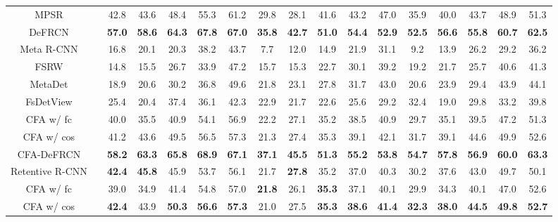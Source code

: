 \documentclass[10pt,twocolumn,letterpaper]{article}
\newcommand{\cmark}{\ding{51}}\newcommand{\xmark}{\ding{55}}\newcommand\minisection[1]{\vspace{1mm}\noindent \textbf{#1}}
\newcommand{\best}[1]{\color{red}\textbf{#1}}
\newcommand{\second}[1]{\color{blue}\textbf{#1}}
\begin{document}
\begin{table*}
\begin{tabular}{c| c | c c c c c | c c c c c | c c c c c}
      MPSR\cite{MPSR}& \xmark & 42.8 & 43.6 & 48.4 & 55.3 & 61.2 & 29.8 & 28.1 & 41.6 & 43.2 & 47.0 & 35.9 & 40.0 & 43.7 & 48.9 & 51.3 \\
      DeFRCN\cite{defrcn}& \xmark & \second{57.0} & \second{58.6} & \second{64.3} & \second{67.8} & \second{67.0} &
     \second{35.8} & \second{42.7} & \second{51.0} & \second{54.4} & \second{52.9} & \second{52.5} & \second{56.6} & \second{55.8} & \best{60.7} & \second{62.5} \\ \Xhline{1pt}
      Meta R-CNN\cite{MetaRCNN}& \xmark & 16.8 & 20.1 & 20.3 & 38.2 & 43.7 & 7.7 & 12.0 & 14.9 & 21.9 & 31.1 & 9.2 & 13.9 & 26.2 & 29.2 & 36.2 \\
      FSRW\cite{FSRW}& \xmark & 14.8 & 15.5 & 26.7 & 33.9 & 47.2 & 15.7 & 15.3 & 22.7 & 30.1 & 39.2 & 19.2 & 21.7 & 25.7 & 40.6 & 41.3 \\
      MetaDet\cite{MetaDet}& \xmark & 18.9 & 20.6 & 30.2 & 36.8 & 49.6 & 21.8 & 23.1 & 27.8 & 31.7 & 43.0 & 20.6 & 23.9 & 29.4 & 43.9 & 44.1\\
      FsDetView\cite{FsDetView}& \xmark & 25.4 & 20.4 & 37.4 & 36.1 & 42.3 & 22.9 & 21.7 & 22.6 & 25.6 & 29.2 & 32.4 & 19.0 & 29.8 & 33.2 & 39.8 \\ \Xhline{1pt}
      \rowcolor[HTML]{EFEFEF}
      CFA w/ fc& \xmark & 40.0 & 35.5 & 40.9 & 54.1 & 56.9 & 22.2 & 27.1 & 35.2 & 38.5 & 40.9 & 29.7 & 35.1 & 39.5 & 47.2 & 51.3 \\
      \rowcolor[HTML]{EFEFEF}
      CFA w/ cos& \xmark & 41.2 & 43.6 & 49.5 & 56.5 & 57.3 & 21.3 & 27.4 & 35.3 & 39.1 & 42.1 & 31.7 & 39.1 & 44.6 & 49.9 & 52.6 \\
      \rowcolor[HTML]{EFEFEF}
    CFA-DeFRCN& \xmark & \best{58.2} & \best{63.3} & \best{65.8} & \best{68.9} & \best{67.1} & \best{37.1} & \best{45.5} & \best{51.3} & \best{55.2} & \best{53.8} & \best{54.7} & \best{57.8} & \best{56.9} & \second{60.0} & \best{63.3} \\
      \midrule[1.5pt]
      Retentive R-CNN\cite{gfsod}& \cmark& \second{42.4} & \second{45.8} & 45.9 & 53.7 & 56.1 & 21.7 & \second{27.8} & 35.2 & 37.0 & 40.3 & 30.2 & 37.6 & 43.0 & 49.7 & 50.1 \\
      \Xhline{1pt}
      \rowcolor[HTML]{EFEFEF}
      CFA w/ fc& \cmark & 39.0 & 34.9 & 41.4 & 54.8 & 57.0 & \second{21.8} & 26.1 & \second{35.3} & 37.1 & 40.1 & 29.9 & 34.3 & 40.1 & 47.0 & 52.6 \\
      \rowcolor[HTML]{EFEFEF}
      CFA w/ cos& \cmark &  \second{42.4} & 43.9 & \second{50.3} & \second{56.6} & \second{57.3} & 21.0 & 27.5 & \second{35.3} & \second{38.6} & \second{41.4} &  \second{32.3} & \second{38.0} & \second{44.5} & \second{49.8} & \second{52.7} \\

\end{tabular}
\end{table*}
\end{document}

